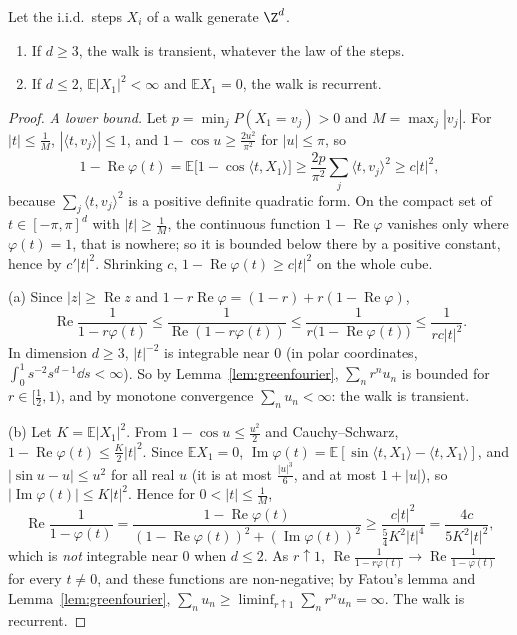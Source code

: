 \begin{theorem}[recurrence on $\Z^d$]\label{thm:recurrencefourier}
Let the i.i.d.\ steps $X_i$ of a walk generate $\Z^d$.
\begin{enumerate}[label=(\alph*)]
\item If $d\ge3$, the walk is transient, whatever the law of the steps.
\item If $d\le2$, $\mathbb E|X_1|^2<\infty$ and $\mathbb EX_1=0$, the walk is recurrent.
\end{enumerate}
\end{theorem}
\begin{proof}
\emph{A lower bound.} Let $p=\min_jP(X_1=v_j)>0$ and $M=\max_j|v_j|$. For $|t|\le\frac1M$, $|\langle t,v_j\rangle|\le1$, and $1-\cos u\ge\frac{2u^2}{\pi^2}$ for
$|u|\le\pi$, so
\[
1-\operatorname{Re}\varphi(t)=\mathbb E\bigl[1-\cos\langle t,X_1\rangle\bigr]\ge\frac{2p}{\pi^2}\sum_j\langle t,v_j\rangle^2\ge c|t|^2,
\]
because $\sum_j\langle t,v_j\rangle^2$ is a positive definite quadratic form. On the compact set of $t\in[-\pi,\pi]^d$ with $|t|\ge\frac1M$, the continuous
function $1-\operatorname{Re}\varphi$ vanishes only where $\varphi(t)=1$, that is nowhere; so it is bounded below there by a positive constant, hence by
$c'|t|^2$. Shrinking $c$, $1-\operatorname{Re}\varphi(t)\ge c|t|^2$ on the whole cube.

(a) Since $|z|\ge\operatorname{Re}z$ and $1-r\operatorname{Re}\varphi=(1-r)+r(1-\operatorname{Re}\varphi)$,
\[
\operatorname{Re}\frac1{1-r\varphi(t)}\le\frac1{\operatorname{Re}(1-r\varphi(t))}\le\frac1{r\bigl(1-\operatorname{Re}\varphi(t)\bigr)}\le\frac1{rc|t|^2}.
\]
In dimension $d\ge3$, $|t|^{-2}$ is integrable near $0$ (in polar coordinates, $\int_0^1s^{-2}s^{d-1}\dd s<\infty$). So by Lemma~\ref{lem:greenfourier}, $\sum_nr^nu_n$
is bounded for $r\in[\frac12,1)$, and by monotone convergence $\sum_nu_n<\infty$: the walk is transient.

(b) Let $K=\mathbb E|X_1|^2$. From $1-\cos u\le\frac{u^2}2$ and Cauchy--Schwarz, $1-\operatorname{Re}\varphi(t)\le\frac K2|t|^2$. Since $\mathbb EX_1=0$,
$\operatorname{Im}\varphi(t)=\mathbb E[\sin\langle t,X_1\rangle-\langle t,X_1\rangle]$, and $|\sin u-u|\le u^2$ for all real $u$ (it is at most $\frac{|u|^3}6$, and at
most $1+|u|$), so $|\operatorname{Im}\varphi(t)|\le K|t|^2$. Hence for $0<|t|\le\frac1M$,
\[
\operatorname{Re}\frac1{1-\varphi(t)}=\frac{1-\operatorname{Re}\varphi(t)}{(1-\operatorname{Re}\varphi(t))^2+(\operatorname{Im}\varphi(t))^2}\ge\frac{c|t|^2}{\frac54K^2|t|^4}=\frac{4c}{5K^2|t|^2},
\]
which is \emph{not} integrable near $0$ when $d\le2$. As $r\uparrow1$, $\operatorname{Re}\frac1{1-r\varphi(t)}\to\operatorname{Re}\frac1{1-\varphi(t)}$ for every $t\ne0$,
and these functions are non-negative; by Fatou's lemma and Lemma~\ref{lem:greenfourier}, $\sum_nu_n\ge\liminf_{r\uparrow1}\sum_nr^nu_n=\infty$. The walk is
recurrent.
\end{proof}

